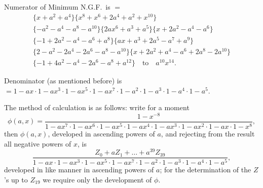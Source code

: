 \documentclass[11pt,a4paper]{article}
\begin{document}
Numerator of Minimum N.G.F.\ is $=$
\begin{multline*}
\{x + a^2 + a^4\} \{x^8 + x^6 + 2a^4 + a^2 + x^{10}\} \\
\{-a^2 - a^4 - a^8 - a^{10}\} \{2ax^6 + a^3 + a^5\} \{x + 2a^2 - a^4 - a^6\} \\
\{-1 + 2a^2 - a^4 - a^6 + a^8\} \{ax + a^3 + 2a^5 - a^7 + a^9\} \\
\{2 - a^2 - 2a^4 - 2a^6 - a^8 - a^{10}\} \{x + 2a^2 + a^4 - a^6 + 2a^8 - 2a^{10}\} \\
\{-1 + 4a^2 - a^4 - 2a^6 - a^8 + a^{12}\} \quad \text{to} \quad a^{10}x^{14}.
\end{multline*}

Denominator (as mentioned before) is $= 1 - ax \cdot 1 - ax^3 \cdot 1 - ax^5 \cdot 1 - ax^7 \cdot 1 - a^2 \cdot 1 - a^3 \cdot 1 - a^4 \cdot 1 - a^5$.

\clearpage
The method of calculation is as follows: write for a moment
\[
\phi(a, x) = \frac{1 - x^{-8}}{1 - ax^7 \cdot 1 - ax^6 \cdot 1 - ax^5 \cdot 1 - ax^4 \cdot 1 - ax^3 \cdot 1 - ax^2 \cdot 1 - ax \cdot 1 - x^8},
\]
then $\phi(a, x)$, developed in ascending powers of $a$, and rejecting from the result all negative powers of $x$, is
\[
\frac{Z_0 + aZ_1 + \dots + a^{39}Z_{39}}{1 - ax \cdot 1 - ax^3 \cdot 1 - ax^5 \cdot 1 - ax^7 \cdot 1 - a^2 \cdot 1 - a^3 \cdot 1 - a^4 \cdot 1 - a^5},
\]
developed in like manner in ascending powers of $a$; for the determination of the $Z$'s up to $Z_{19}$ we require only the development of $\phi$.
\end{document}

